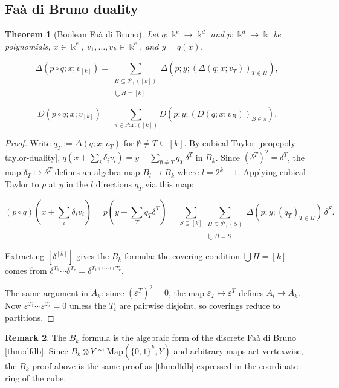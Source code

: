 \documentclass[10pt,a4paper]{article}
\theoremstyle{plain}
\newtheorem{theorem}{Theorem}
\theoremstyle{definition}
\newtheorem{remark}[theorem]{Remark}
\newcommand{\ik}{\Bbbk} %
\newcommand{\1}{\mathbb{1}} %
\newcommand{\set}[1]{\{#1\}} %
\newcommand{\KP}{\mathcal{P}}
\newcommand{\eps}{\varepsilon} %
\newcommand{\Part}{\mathrm{Part}} %
\begin{document}
\subsection{Faà di Bruno duality}\label{fauxe0-di-bruno-duality-1}

\begin{theorem}[Boolean Faà di Bruno]

\label{thm:cubical-fdb} Let \(q: \ik^e \to \ik^d\) and
\(p: \ik^d \to \ik\) be polynomials, \(x \in \ik^e\),
\(v_1, \dots, v_k \in \ik^e\), and \(y = q(x)\).

\[
  \Delta(p \circ q; x; v_{[k]}) = \sum_{\substack{H \subseteq \KP_+([k]) \\\\ \bigcup H = [k]}} \Delta(p; y; (\Delta(q; x; v_T))_{T \in H}),
\]

\[
  D(p \circ q; x; v_{[k]}) = \sum_{\pi \in \Part([k])} D(p; y; (D(q; x; v_B))_{B \in \pi}).
\]

\end{theorem}

\begin{proof}

Write \(q_T := \Delta(q; x; v_T)\) for
\(\emptyset \neq T \subseteq [k]\). By cubical Taylor
\ref{prop:poly-taylor-duality},
\(q(x + \sum_i \delta_i v_i) = y + \sum_{\emptyset \neq T} q_T\, \delta^T\)
in \(B_k\). Since \((\delta^T)^2 = \delta^T\), the map
\(\delta_T \mapsto \delta^T\) defines an algebra map \(B_l \to B_k\)
where \(l = 2^k - 1\). Applying cubical Taylor to \(p\) at \(y\) in the
\(l\) directions \(q_T\) via this map:

\[
  (p \circ q)(x + {\textstyle\sum_i} \delta_i v_i) = p(y + {\textstyle\sum_T} q_T \delta^T) = \sum_{S \subseteq [k]} \sum_{\substack{H \subseteq \KP_+(S) \\\\ \bigcup H = S}} \Delta(p; y; (q_T)_{T \in H})\, \delta^S.
\]

Extracting \([\delta^{[k]}]\) gives the \(B_k\) formula: the covering
condition \(\bigcup H = [k]\) comes from
\(\delta^{T_1} \cdots \delta^{T_r} = \delta^{T_1 \cup \cdots \cup T_r}\).

The same argument in \(A_k\): since \((\eps^T)^2 = 0\), the map
\(\eps_T \mapsto \eps^T\) defines \(A_l \to A_k\). Now
\(\eps^{T_1} \cdots \eps^{T_r} = 0\) unless the \(T_i\) are pairwise
disjoint, so coverings reduce to partitions.

\end{proof}

\begin{remark}

The \(B_k\) formula is the algebraic form of the discrete Faà di Bruno
\ref{thm:dfdb}. Since
\(B_k \otimes Y \cong \mathrm{Map}(\set{0,1}^k, Y)\) and arbitrary maps
act vertexwise, the \(B_k\) proof above is the same proof as
\ref{thm:dfdb} expressed in the coordinate ring of the cube.

\end{remark}
\end{document}
